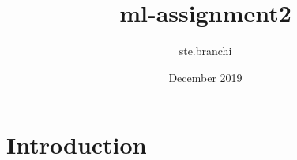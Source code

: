 \documentclass{article}
\title{ml-assignment2}
\author{ste.branchi }
\date{December 2019}
\begin{document}
\maketitle

\section{Introduction}
\end{document}

